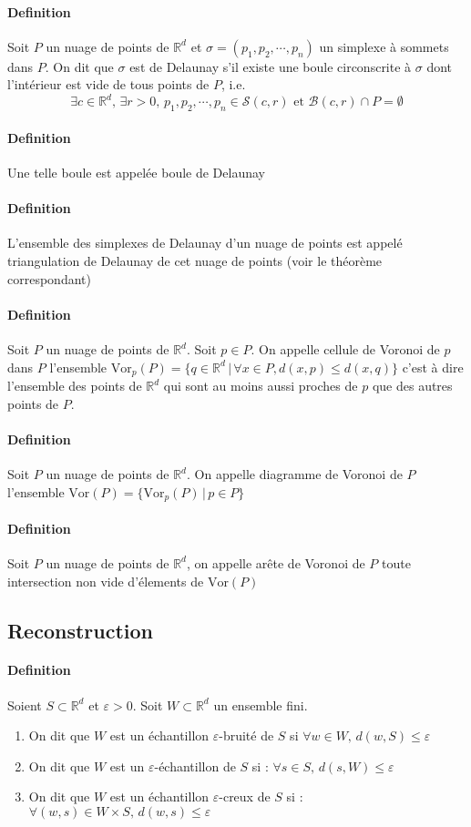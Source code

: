 ﻿\documentclass{article}
\begin{document}
\paragraph{Definition} Soit $P$ un nuage de points de $\mathbb{R}^d$ et $\sigma = (p_1, p_2, \cdots, p_n)$ un simplexe à sommets dans $P$. On dit que $\sigma$ est de Delaunay s'il existe une boule circonscrite à $\sigma$ dont l'intérieur est vide de tous points de $P$, i.e.
$$\exists c\in \mathbb{R}^d, \, \exists r > 0, \, p_1, p_2, \cdots, p_n \in \mathcal S(c, r) \text{ et }\mathcal B(c, r)\cap P = \emptyset$$
\paragraph{Definition} Une telle boule est appelée boule de Delaunay
\paragraph{Definition} L'ensemble des simplexes de Delaunay d'un nuage de points est appelé triangulation de Delaunay de cet nuage de points (voir le théorème correspondant)
\paragraph{Definition} Soit $P$ un nuage de points de $\mathbb{R}^d$. Soit $p\in P$. On appelle cellule de Voronoi de $p$ dans $P$ l'ensemble $\mathrm{Vor}_p(P) = \{q\in \mathbb{R}^d\,|\,\forall x\in P, d(x, p) \leq d(x, q)\}$ c'est à dire l'ensemble des points de $\mathbb{R}^d$ qui sont au moins aussi proches de $p$ que des autres points de $P$.
\paragraph{Definition} Soit $P$ un nuage de points de $\mathbb{R}^d$. On appelle diagramme de Voronoi de $P$ l'ensemble $\mathrm{Vor}(P) = \{\mathrm{Vor}_p(P)\,|\,p\in P\}$
\paragraph{Definition} Soit $P$ un nuage de points de $\mathbb{R}^d$, on appelle arête de Voronoi de $P$ toute intersection non vide d'élements de $\mathrm{Vor}(P)$
\subsection{Reconstruction}
\paragraph{Definition} Soient $S \subset \mathbb{R}^d$ et $\varepsilon>0$. Soit $W\subset \mathbb{R}^d$ un ensemble fini.
\begin{enumerate}
\item On dit que $W$ est un échantillon $\varepsilon$-bruité de $S$ si $\forall w \in W,\, d(w, S) \leq \varepsilon$
\item On dit que $W$ est un $\varepsilon$-échantillon de $S$ si : $\forall s \in S,\, d(s, W) \leq \varepsilon$
\item On dit que $W$ est un échantillon $\varepsilon$-creux de $S$ si : $\forall (w, s) \in W\times S,\, d(w, s) \leq \varepsilon$
\end{enumerate}
\end{document}
